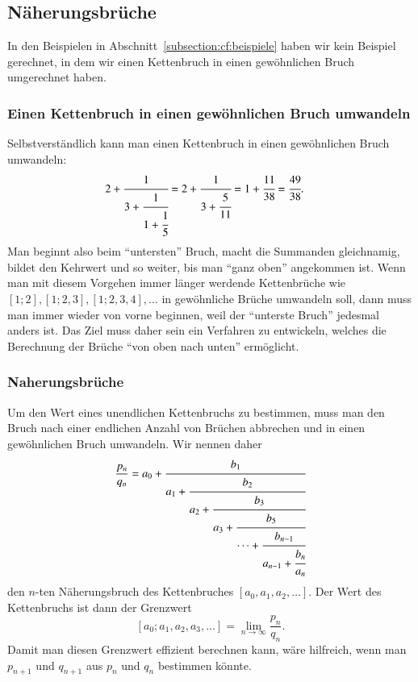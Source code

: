 %
%
%
\subsection{Näherungsbrüche\label{subsection:cf:naherungsbrueche}}
In den Beispielen in Abschnitt~\ref{subsection:cf:beispiele} haben
wir kein Beispiel gerechnet, in dem wir einen Kettenbruch in einen
gewöhnlichen Bruch umgerechnet haben.

\subsubsection{Einen Kettenbruch in einen gewöhnlichen Bruch umwandeln}
Selbstverständlich kann man einen Kettenbruch in einen gewöhnlichen
Bruch umwandeln:
\begin{align*}
2+\cfrac{1}{
3+\cfrac{1}{
1+\cfrac{1}{5}}}
&=
2+\cfrac{1}{
3+\cfrac{5}{11}}
=
1+\cfrac{11}{38}
=
\cfrac{49}{38}.
\end{align*}
Man beginnt also beim ``untersten'' Bruch, macht die Summanden gleichnamig,
bildet den Kehrwert und so weiter, bis man ``ganz oben'' angekommen ist.
Wenn man mit diesem Vorgehen immer länger werdende Kettenbrüche wie
$[1;2], [1;2,3], [1;2,3,4],\ldots$ in gewöhnliche Brüche umwandeln soll,
dann muss man immer wieder von vorne beginnen, weil der ``unterste Bruch''
jedesmal anders ist.
Das Ziel muss daher sein ein Verfahren zu entwickeln, welches die Berechnung
der Brüche ``von oben nach unten'' ermöglicht.

\subsubsection{Naherungsbrüche}
Um den Wert eines unendlichen Kettenbruchs zu bestimmen, muss man den
Bruch nach einer endlichen Anzahl von Brüchen abbrechen und in einen
gewöhnlichen Bruch umwandeln.
Wir nennen daher
\[
\frac{p_n}{q_n}
=
a_0+\cfrac{b_1}{
a_1+\cfrac{b_2}{
a_2+\cfrac{b_3}{
a_3+\cfrac{b_5}{
\dots+
\cfrac{b_{n-1}}{
a_{n-1}+\cfrac{b_n}{a_n}
}}}}}
\]
den $n$-ten Näherungsbruch des Kettenbruches $[a_0,a_1,a_2,\dots]$.
Der Wert des Kettenbruchs ist dann der Grenzwert
\[
[a_0;a_1,a_2,a_3,\dots]
=
\lim_{n\to\infty}\frac{p_n}{q_n}.
\]
Damit man diesen Grenzwert effizient berechnen kann, wäre hilfreich,
wenn man $p_{n+1}$ und $q_{n+1}$ aus $p_n$ und $q_n$ bestimmen könnte.

